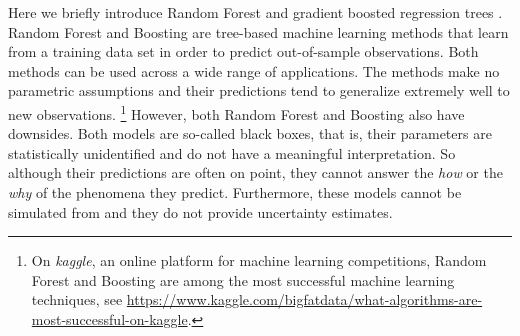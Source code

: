 \documentclass[a4paper,usenames,dvipsnames]{article}
\newenvironment{revision}{\color{black}}{\color{black}}
\begin{document}
\protect\begin{revision}
Here we briefly introduce Random Forest \cite{breiman2001random} and gradient boosted regression trees \cite{Friedman2001greedy}.
Random Forest and Boosting are tree-based machine learning methods that learn from a training data set in order to predict out-of-sample observations.
Both methods can be used across a wide range of applications.
The methods make no parametric assumptions and their predictions tend to generalize extremely well to new observations.%
\footnote{\protect\begin{revision}On \emph{kaggle}, an online platform for machine learning competitions, Random Forest and Boosting are among the most successful machine learning techniques, see \url{https://www.kaggle.com/bigfatdata/what-algorithms-are-most-successful-on-kaggle}.\protect\end{revision}}
However, both Random Forest and Boosting also have downsides.
Both models are so-called black boxes, that is, their parameters are statistically unidentified and do not have a meaningful interpretation.
So although their predictions are often on point, they cannot answer the \emph{how} or the \emph{why} of the phenomena they predict. Furthermore, these models cannot be simulated from and they do not provide uncertainty estimates.%
\protect\end{revision}
\end{document}
